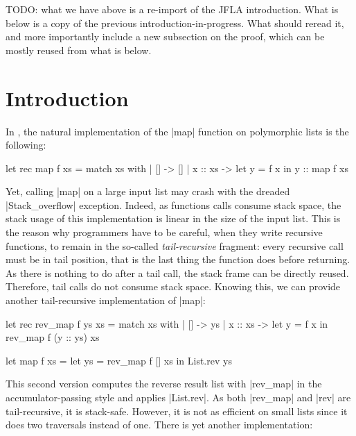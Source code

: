 TODO: what we have above is a re-import of the JFLA introduction.
What is below is a copy of the previous introduction-in-progress.
What should reread it, and more importantly include a new subsection on the proof,
which can be mostly reused from what is below.

\section{Introduction}

In \OCaml, the natural implementation of the \ocaml|map| function on polymorphic lists is the following:

\begin{Ocaml}
let rec map f xs =
  match xs with
  | [] ->
      []
  | x :: xs ->
      let y = f x in
      y :: map f xs
\end{Ocaml}

Yet, calling \ocaml|map| on a large input list may crash with the dreaded \ocaml|Stack_overflow| exception.
%
Indeed, as functions calls consume stack space, the stack usage of this implementation is linear in the size of the input list.
%
This is the reason why \OCaml programmers have to be careful, when they write recursive functions, to remain in the so-called \emph{tail-recursive} fragment: every recursive call must be in tail position, that is the last thing the function does before returning.
%
As there is nothing to do after a tail call, the stack frame can be directly reused.
%
Therefore, tail calls do not consume stack space.
%
Knowing this, we can provide another tail-recursive implementation of \ocaml|map|:

\begin{minipage}{0.5\linewidth}
\begin{Ocaml}
let rec rev_map f ys xs =
  match xs with
  | [] ->
      ys
  | x :: xs ->
      let y = f x in
      rev_map f (y :: ys) xs
\end{Ocaml}
\end{minipage}
\hfill
\begin{minipage}{0.5\linewidth}
\begin{Ocaml}
let map f xs =
  let ys = rev_map f [] xs in
  List.rev ys
\end{Ocaml}
\end{minipage}

This second version computes the reverse result list with \ocaml|rev_map| in the accumulator-passing style and applies \ocaml|List.rev|.
%
As both \ocaml|rev_map| and \ocaml|rev| are tail-recursive, it is stack-safe.
%
However, it is not as efficient on small lists since it does two traversals instead of one.
%
There is yet another implementation:

